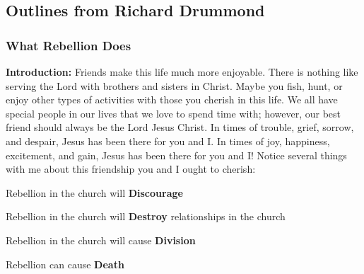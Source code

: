 \subsection{Outlines from Richard Drummond}

\subsubsection{What Rebellion Does}


\noindent \textbf{Introduction: } Friends make this life much more enjoyable. There is nothing like serving the Lord with brothers and sisters in Christ. Maybe you fish, hunt, or enjoy other types of activities with those you cherish in this life. We all have special people in our lives that we love to spend time with; however, our best friend should always be the Lord Jesus Christ. In times of trouble, grief, sorrow, and despair, Jesus has been there for you and I. In times of joy, happiness, excitement, and gain, Jesus has been there for you and I!
Notice several things with me about this friendship you and I ought to cherish:
%
\begin{compactenum}[I.][8]
    \item Rebellion in the church will \textbf{Discourage} %
    \item Rebellion in the church will \textbf{Destroy} relationships in the church%
    \item Rebellion in the church will cause \textbf{Division} %
    \item Rebellion can cause \textbf{Death} %
\end{compactenum}




